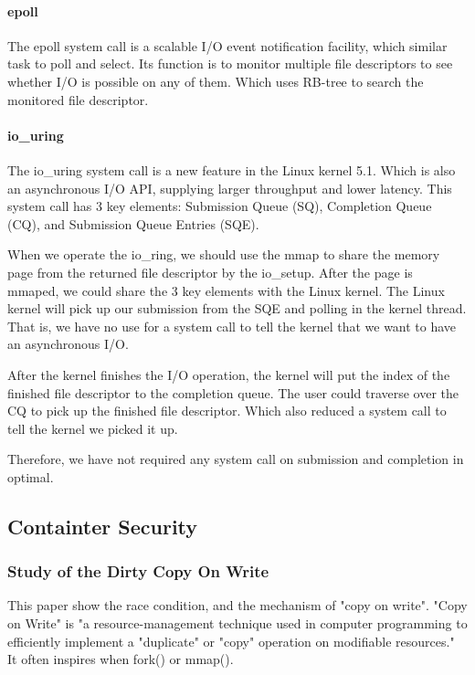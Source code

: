 \documentclass[12pt,a4paper]{article}
\begin{document}
\paragraph{epoll}
The epoll system call is a scalable I/O event notification facility, which similar
task to poll and select. Its function is to monitor multiple file descriptors to
see whether I/O is possible on any of them. Which uses RB-tree to search the monitored
file descriptor.

\paragraph{io\_uring}
The io\_uring system call is a new feature in the Linux kernel 5.1. Which is also an
asynchronous I/O API, supplying larger throughput and lower latency. This system call
has 3 key elements: Submission Queue (SQ), Completion Queue (CQ), and Submission Queue
Entries (SQE).

When we operate the io\_ring, we should use the mmap to share the memory page from
the returned file descriptor by the io\_setup. After the page is mmaped, we could share
the 3 key elements with the Linux kernel. The Linux kernel will pick up our submission
from the SQE and polling in the kernel thread. That is, we have no use for a system call
to tell the kernel that we want to have an asynchronous I/O.

After the kernel finishes the I/O operation, the kernel will put the index of the finished
file descriptor to the completion queue. The user could traverse over the CQ to pick up
the finished file descriptor. Which also reduced a system call to tell the kernel we picked
it up.

Therefore, we have not required any system call on submission and completion in optimal.

\subsection{Containter Security}
\hypertarget{security}{}
\subsubsection{Study of the Dirty Copy On Write}
This paper \cite{Study_Dirty_Cow} show the race condition, and the mechanism of
"copy on write". "Copy on Write" is "a resource-management technique used in
computer programming to efficiently implement a "duplicate" or "copy" operation
on modifiable resources." \cite{CoW_wiki} It often inspires when fork() or mmap().
\end{document}
